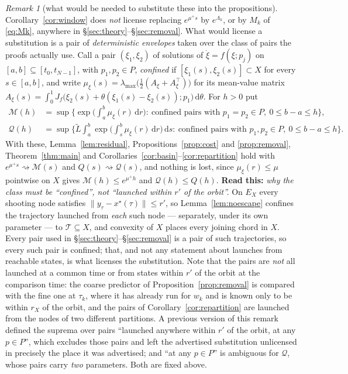 \documentclass[11pt]{article}
\theoremstyle{remark}\newtheorem{remark}{Remark}
\newcommand{\norm}[1]{\lVert #1\rVert}
\newcommand{\dd}{\,\mathrm{d}}
\newcommand{\readthis}[1]{\textbf{Read this:} #1}
\begin{document}
\begin{remark}[what would be needed to substitute these into the propositions]\label{rem:envelopes}
Corollary~\ref{cor:window} does \emph{not} license replacing $e^{\mu^{+}s}$ by $e^{\Lambda_k}$, or by $M_k$ of \eqref{eq:Mk}, anywhere in \S\ref{sec:theory}--\S\ref{sec:removal}. What would license a substitution is a pair of \emph{deterministic envelopes} taken over the class of pairs the proofs actually use. Call a pair $(\xi_1,\xi_2)$ of solutions of $\dot\xi=f(\xi;p_j)$ on $[a,b]\subseteq[t_0,t_{N-1}]$, with $p_1,p_2\in P$, \emph{confined} if $[\xi_1(s),\xi_2(s)]\subset X$ for every $s\in[a,b]$, and write $\mu_\xi(s)=\lambda_{\max}\big(\tfrac12(A_\xi+A_\xi^{\top})\big)$ for its mean-value matrix $A_\xi(s)=\int_0^1J_f\big(\xi_2(s)+\theta(\xi_1(s)-\xi_2(s));p_1\big)\dd\theta$. For $h>0$ put
\begin{align}
\mathcal M(h)&=\sup\Big\{\exp\Big(\int_a^b\mu_\xi(r)\dd r\Big):\ \text{confined pairs with }p_1=p_2\in P,\
0\le b-a\le h\Big\},\label{eq:envelopeM}\\
\mathcal Q(h)&=\sup\Big\{\tilde L\int_a^b\exp\Big(\int_s^b\mu_\xi(r)\dd r\Big)\dd s:\
\text{confined pairs with }p_1,p_2\in P,\ 0\le b-a\le h\Big\}.\label{eq:envelopeQ}
\end{align}
With these, Lemma~\ref{lem:residual}, Propositions~\ref{prop:cost} and \ref{prop:removal}, Theorem~\ref{thm:main} and Corollaries~\ref{cor:basin}--\ref{cor:repartition} hold with $e^{\mu^{+}s}\rightsquigarrow\mathcal M(s)$ and $Q(s)\rightsquigarrow\mathcal Q(s)$, and nothing is lost, since $\mu_\xi(r)\le\mu$ pointwise on $X$ gives $\mathcal M(h)\le e^{\mu^{+}h}$ and $\mathcal Q(h)\le Q(h)$.
\readthis{\emph{why the class must be ``confined'', not ``launched within $r'$ of the orbit''.} On $E_X$ every shooting node satisfies $\norm{y_\tau-x^\star(\tau)}\le r'$, so Lemma~\ref{lem:noescape} confines the trajectory launched from \emph{each} such node --- separately, under its own parameter --- to $\mathcal T\subseteq X$, and convexity of $X$ places every joining chord in $X$. Every pair used in \S\ref{sec:theory}--\S\ref{sec:removal} is a pair of such trajectories, so every such pair is confined; that, and not any statement about launches from reachable states, is what licenses the substitution. Note that the pairs are \emph{not} all launched at a common time or from states within $r'$ of the orbit at the comparison time: the coarse predictor of Proposition~\ref{prop:removal} is compared with the fine one at $\tau_k$, where it has already run for $w_k$ and is known only to be within $r_X$ of the orbit, and the pairs of Corollary~\ref{cor:repartition} are launched from the nodes of two different partitions. A previous version of this remark defined the suprema over pairs ``launched anywhere within $r'$ of the orbit, at any $p\in P$'', which excludes those pairs and left the advertised substitution unlicensed in precisely the place it was advertised; and ``at any $p\in P$'' is ambiguous for $\mathcal Q$, whose pairs carry \emph{two} parameters. Both are fixed above.
}
\end{remark}
\end{document}
